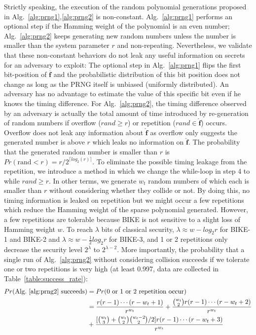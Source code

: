\documentclass[preprint]{iacrtrans}
\begin{document}
Strictly speaking, the execution of the random polynomial generations proposed in Alg.~\ref{alg:prng1},\ref{alg:prng2} is non-constant. Alg.~\ref{alg:prng1} performs an optional step if the Hamming weight of the polynomial is an even number; Alg.~\ref{alg:prng2} keeps generating new random numbers unless the number is smaller than the system parameter $r$ and non-repeating. Nevertheless, we validate that these non-constant behaviors do not leak any useful information on secrets for an adversary to exploit: The optional step in Alg.~\ref{alg:prng1} flips the first bit-position of $\mathbf{\overline{f}}$ and the probabilistic distribution of this bit position does not change as long as the PRNG itself is unbiased (uniformly distributed). An adversary has no advantage to estimate the value of this specific bit even if he knows the timing difference. For Alg.~\ref{alg:prng2}, the timing difference observed by an adversary is actually the total amount of time introduced by re-generation of random numbers if overflow ($rand\geq r$) or repetition ($rand\in \mathbf{\hat{f}}$) occurs. Overflow does not leak any information about $\mathbf{\hat{f}}$ as overflow only suggests the generated number is above $r$ which leaks no information on $\mathbf{\hat{f}}$. The probability that the generated random number is smaller than $r$ is $Pr(\text{rand} < r)= r/2^{\lceil log_2(r)\rceil}$. To eliminate the possible timing leakage from the repetition, we introduce a method in which we change the while-loop in step 4 to while $rand\geq r$. In other terms, we generate $w_t$ random numbers of which each is smaller than $r$ without considering whether they collide or not. By doing this, no timing information is leaked on repetition but we might occur a few repetitions which reduce the Hamming weight of the sparse polynomial generated. However, a few repetitions are tolerable because BIKE is not sensitive to a slight loss of Hamming weight $w$. To reach $\lambda$ bits of classical security, $\lambda\approx w-log_2r$ for BIKE-1 and BIKE-2 and $\lambda\approx w-\frac{1}{2}log_2r$ for BIKE-3, and 1 or 2 repetitions only decrease the security level $2^\lambda$ to $2^{\lambda-2}$.
More importantly, the probability that a single run of Alg.~\ref{alg:prng2} without considering collision succeeds if we tolerate one or two repetitions is very high (at least 0.997, data are collected in Table~\ref{table:success_rate}):
\begin{align}
    Pr(\text{Alg.~\ref{alg:prng2} succeeds}) &= Pr(\text{0 or 1 or 2 repetition occur})\\
    &=\frac{r(r-1)\cdots (r-w_t+1)}{r^{w_t}}+ \frac{\binom{w_t}{2}r(r-1)\cdots (r-w_t+2)}{r^{w_t}}\\
    &+ \frac{[\binom{w_t}{3}+\binom{w_t}{2}\binom{w_t-2}{2}/2]  r(r-1)\cdots (r-w_t+3) }{r^{w_t}}
\end{align}
\end{document}
